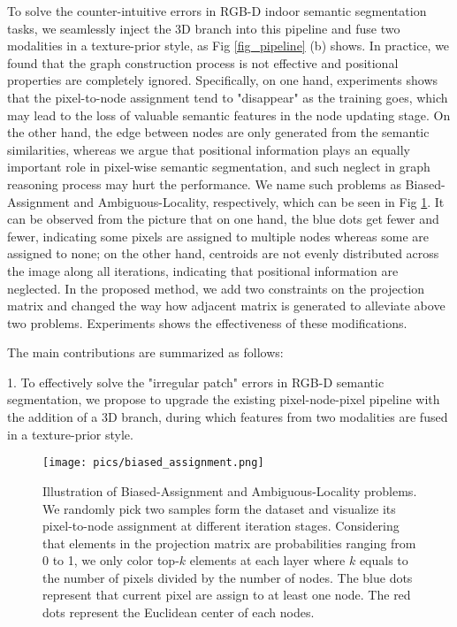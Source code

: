 ﻿\documentclass[journal]{IEEEtran}
\begin{document}
    
    
    To solve the counter-intuitive errors in RGB-D indoor semantic segmentation tasks, we seamlessly inject the 3D branch into this pipeline and fuse two modalities in a texture-prior style, as Fig \ref{fig_pipeline} (b) shows. In practice, we found that the graph construction process is not effective and positional properties are completely ignored. Specifically, on one hand, experiments shows that the pixel-to-node assignment tend to "disappear" as the training goes, which may lead to the loss of valuable semantic features in the node updating stage. On the other hand, the edge between nodes are only generated from the semantic similarities, whereas we argue that positional information plays an equally important role in pixel-wise semantic segmentation, and such neglect in graph reasoning process may hurt the performance. We name such problems as Biased-Assignment and Ambiguous-Locality, respectively, which can be seen in Fig \ref{fig_blue_red}. It can be observed from the picture that on one hand, the blue dots get fewer and fewer, indicating some pixels are assigned to multiple nodes whereas some are assigned to none; on the other hand, centroids are not evenly distributed across the image along all iterations, indicating that positional information are neglected. In the proposed method, we add two constraints on the projection matrix and changed the way how adjacent matrix is generated to alleviate above two problems. Experiments shows the effectiveness of these modifications. 

    The main contributions are summarized as follows: 

    1. To effectively solve the "irregular patch" errors in RGB-D semantic segmentation, we propose to upgrade the existing pixel-node-pixel pipeline with the addition of a 3D branch, during which features from two modalities are fused in a texture-prior style.

    

\begin{figure}
    \centering
    \texttt{[image: pics/biased\_assignment.png]}
    \caption{Illustration of Biased-Assignment and Ambiguous-Locality problems. We randomly pick two samples form the dataset and visualize its pixel-to-node assignment at different iteration stages. Considering that elements in the projection matrix are probabilities ranging from 0 to 1, we only color top-$k$ elements at each layer where $k$ equals to the number of pixels divided by the number of nodes. The blue dots represent that current pixel are assign to at least one node. The red dots represent the Euclidean center of each nodes. }
    \label{fig_blue_red}
\end{figure}
    
\end{document}
